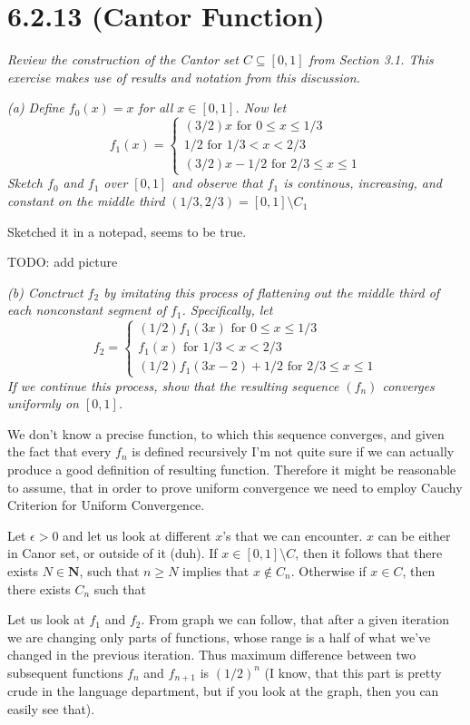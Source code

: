 \documentclass[11pt,oneside,titlepage]{book}
\begin{document}
\section*{6.2.13 (Cantor Function)}
\textit{Review the construction of the Cantor set $C \subseteq [0, 1]$ from
  Section 3.1. This exercise makes use of results and notation from this
  discussion.}

\textit{(a) Define $f_0(x) = x$ for all $x \in [0, 1]$. Now let }
$$f_1(x) =
\begin{cases}
  (3/2)x \text{ for } 0 \leq x \leq 1/3 \\
  1/2 \text{ for } 1/3 < x < 2/3 \\
  (3/2)x - 1/2 \text{ for } 2/3 \leq x \leq 1
\end{cases}
$$
\textit{Sketch $f_0$ and $f_1$ over $[0, 1]$ and observe that $f_1$ is
  continous, increasing, and constant on the middle third
  $(1/3, 2/3) = [0, 1] \setminus C_1$}

Sketched it in a notepad, seems to be true.

TODO: add picture

\textit{(b) Conctruct $f_2$ by imitating this process of flattening out the
  middle third of each nonconstant segment of $f_1$. Specifically, let }
$$f_2 =
\begin{cases}
  (1/2)f_1(3x) \text{ for } 0 \leq x \leq 1/3 \\
  f_1(x) \text{ for } 1/3 < x < 2/3 \\
  (1/2)f_1(3x - 2) + 1/2 \text{ for } 2/3 \leq x \leq 1
\end{cases}
$$
\textit{If we continue this process, show that the resulting sequence $(f_n)$
converges uniformly on $[0, 1]$.}

We don't know a precise function, to which this sequence converges, and
given the fact that every $f_n$ is defined recursively I'm not quite sure if we
can actually produce a good definition of resulting function. Therefore
it might be reasonable to assume, that in order to prove uniform
convergence we need to employ Cauchy Criterion for Uniform Convergence.

Let $\epsilon > 0$ and let us look at different $x$'s that we can encounter.
$x$ can be either in Canor set, or outside of it (duh). If
$x \in [0, 1] \setminus C$, then it follows that there exists
$N \in \textbf{N}$, such that $n \geq N$ implies that $x \notin C_n$.
Otherwise if $x \in C$, then there exists $C_n$ such that 

Let us look at $f_1$ and $f_2$. From graph we can follow, that after a given
iteration we are changing only parts of functions, whose range is a half
of what we've changed in the previous iteration. Thus
maximum difference between two subsequent functions $f_n$ and $f_{n + 1}$
is $(1/2)^{n}$ (I know, that this part is pretty crude in the language
department, but if you look
at the graph, then you can easily see that).
\end{document}
